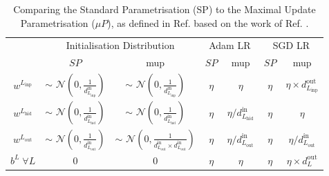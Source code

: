\begin{table}[h]
  \begin{center}
      \begin{tabular}{c|cc|cc|cc} 
      	 \hline \hline
          & \multicolumn{2}{c|}{Initialisation Distribution} & \multicolumn{2}{c|}{Adam LR} & \multicolumn{2}{c}{SGD LR}  \\
            & $SP$  & \gls{mup} & $SP$  & \gls{mup} & $SP$  & \gls{mup}  \\ \hline
          $w^{L_\textrm{inp}}$ & $\sim$ $\mathcal{N}\left(0, \frac{1}{d^{\textrm{in}}_{L_\textrm{inp}}}\right)$ & $\sim$ $\mathcal{N}\left(0, \frac{1}{d^{\textrm{in}}_{L_\textrm{inp}}}\right)$                                         & $\eta$ & $\eta$                                    & $\eta$ & $\eta \times d^{\textrm{out}}_{L_\textrm{inp}}$ \\ 
          $w^{L_\textrm{hid}}$ & $\sim$ $\mathcal{N}\left(0, \frac{1}{d^{\textrm{in}}_{L_\textrm{hid}}}\right)$ & $\sim$ $\mathcal{N}\left(0, \frac{1}{d^{\textrm{in}}_{L_\textrm{hid}}}\right)$                                         & $\eta$ & $\eta / d^{\textrm{in}}_{L_\textrm{hid}}$ & $\eta$ & $\eta$                                    \\ 
          $w^{L_\textrm{out}}$ & $\sim$ $\mathcal{N}\left(0, \frac{1}{d^{\textrm{in}}_{L_\textrm{out}}}\right)$ & $\sim$ $\mathcal{N}\left(0, \frac{1}{d^{\textrm{in}}_{L_\textrm{out}}\times d^{\textrm{in}}_{L_\textrm{out}}}\right)$  & $\eta$ & $\eta / d^{\textrm{in}}_{L_\textrm{out}}$ & $\eta$ & $\eta / d^{\textrm{in}}_{L_\textrm{out}}$ \\
          $b^{L} \;\forall L$ & 0 & 0                                                                                                                                                                                          & $\eta$ & $\eta$                                    & $\eta$ & $\eta \times d^{\textrm{out}}_{L}$              \\  \hline \hline
      \end{tabular}
    \caption{Comparing the Standard Parametrisation (SP) to the Maximal Update Parametrisation ($\mu P$), as defined in Ref. \cite{yang2021tuning} based on the work of Ref. \cite{pmlr-v139-yang21c}.}
    \label{tab:mupvsspdef}
  \end{center}
\end{table}

